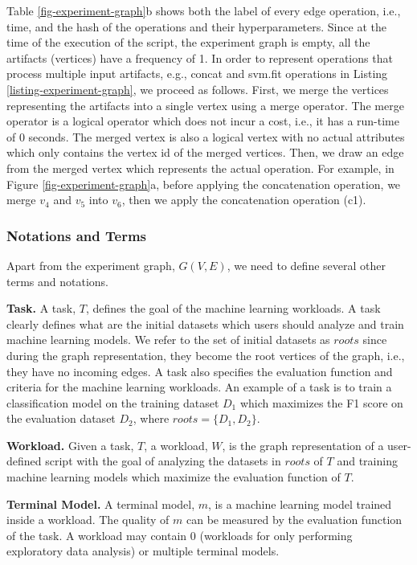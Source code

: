 Table \ref{fig-experiment-graph}b shows both the label of every edge operation, i.e., time, and the hash of the operations and their hyperparameters.
Since at the time of the execution of the script, the experiment graph is empty, all the artifacts (vertices) have a frequency of 1.
In order to represent operations that process multiple input artifacts, e.g., concat and svm.fit operations in Listing \ref{listing-experiment-graph}, we proceed as follows.
First, we merge the vertices representing the artifacts into a single vertex using a merge operator.
The merge operator is a logical operator which does not incur a cost, i.e., it has a run-time of 0 seconds.
The merged vertex is also a logical vertex with no actual attributes which only contains the vertex id of the merged vertices.
Then, we draw an edge from the merged vertex which represents the actual operation.
For example, in Figure \ref{fig-experiment-graph}a, before applying the concatenation operation, we merge $v_4$ and $v_5$ into $v_6$, then we apply the concatenation operation (c1).

\subsubsection{Notations and Terms}\label{notations-terms}
Apart from the experiment graph, $G(V,E)$, we need to define several other terms and notations.

\textbf{Task.} A task, $T$, defines the goal of the machine learning workloads. 
A task clearly defines what are the initial datasets which users should analyze and train machine learning models. 
We refer to the set of initial datasets as $roots$ since during the graph representation, they become the root vertices of the graph, i.e., they have no incoming edges.
A task also specifies the evaluation function and criteria for the machine learning workloads.
An example of a task is to train a classification model on the training dataset $D_1$ which maximizes the F1 score on the evaluation dataset $D_2$, where $roots = \{D_1, D_2\}$.

\textbf{Workload.} Given a task, $T$, a workload, $W$, is the graph representation of a user-defined script with the goal of analyzing the datasets in $roots$ of $T$ and training machine learning models which maximize the evaluation function of $T$.

\textbf{Terminal Model.} A terminal model, $m$, is a machine learning model trained inside a workload.
The quality of $m$ can be measured by the evaluation function of the task.
A workload may contain $0$ (workloads for only performing exploratory data analysis) or multiple terminal models.

